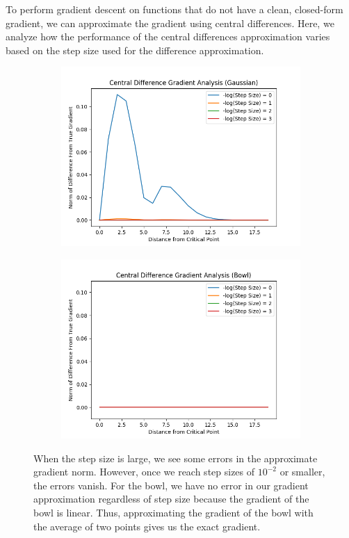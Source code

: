 \documentclass{article}
\begin{document}
To perform gradient descent on functions that do not have a clean, closed-form gradient, we can approximate the gradient using central differences. Here, we analyze how the performance of the central differences approximation varies based on the step size used for the difference approximation.

\begin{figure}[H]
        \begin{subfigure}[b]{0.5\textwidth}
                \includegraphics[width=\linewidth]{../P1/figs/central_diff_gauss.png}
        \end{subfigure}%
        \begin{subfigure}[b]{0.5\textwidth}
                \includegraphics[width=\linewidth]{../P1/figs/central_diff_bowl.png}
        \end{subfigure}%
\caption*{When the step size is large, we see some errors in the approximate gradient norm. However, once we reach step sizes of $10^{-2}$ or smaller, the errors vanish. For the bowl, we have no error in our gradient approximation regardless of step size because the gradient of the bowl is linear. Thus, approximating the gradient of the bowl with the average of two points gives us the exact gradient.}
\end{figure}
\end{document}
